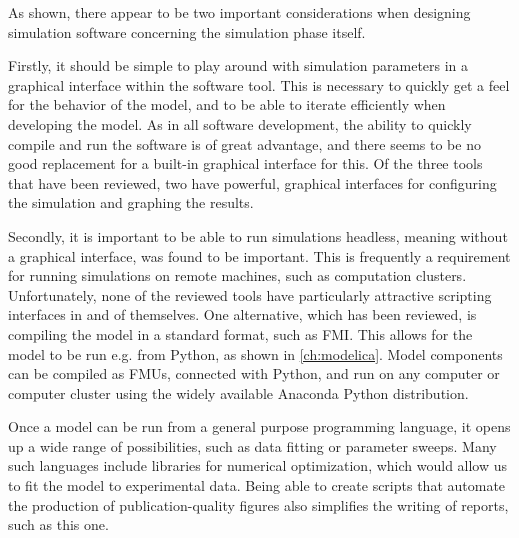 \documentclass[\rootfolder/main.tex]{subfiles}
\begin{document}
As shown, there appear to be two important considerations when designing simulation software concerning the simulation phase itself.

Firstly, it should be simple to play around with simulation parameters in a graphical interface within the software tool.
This is necessary to quickly get a feel for the behavior of the model, and to be able to iterate efficiently when developing the model.
As in all software development, the ability to quickly compile and run the software is of great advantage, and there seems to be no good replacement for a built-in graphical interface for this.
Of the three tools that have been reviewed, two have powerful, graphical interfaces for configuring the simulation and graphing the results.

Secondly, it is important to be able to run simulations headless, meaning without a graphical interface, was found to be important.
This is frequently a requirement for running simulations on remote machines, such as computation clusters.
Unfortunately, none of the reviewed tools have particularly attractive scripting interfaces in and of themselves.
One alternative, which has been reviewed, is compiling the model in a standard format, such as FMI.
This allows for the model to be run e.g. from Python, as shown in \cref{ch:modelica}.
Model components can be compiled as FMUs, connected with Python, and run on any computer or computer cluster using the widely available Anaconda Python distribution.

Once a model can be run from a general purpose programming language, it opens up a wide range of possibilities, such as data fitting or parameter sweeps.
Many such languages include libraries for numerical optimization, which would allow us to fit the model to experimental data.
Being able to create scripts that automate the production of publication-quality figures also simplifies the writing of reports, such as this one.
\end{document}
